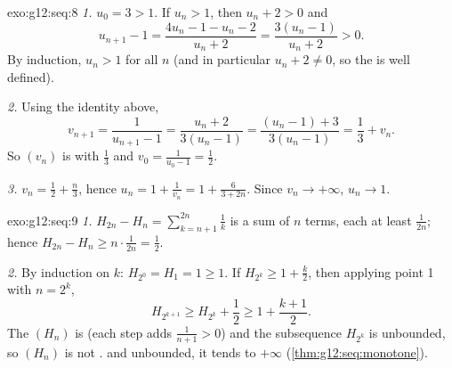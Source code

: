 \begin{solution}{exo:g12:seq:8}
\emph{1.} $u_0 = 3 > 1$. If $u_n > 1$, then $u_n + 2 > 0$ and
\[
u_{n+1} - 1 = \frac{4u_n - 1 - u_n - 2}{u_n + 2} = \frac{3(u_n - 1)}{u_n + 2} > 0 .
\]
By induction, $u_n > 1$ for all $n$ (and in particular $u_n + 2 \neq 0$, so
the  is well defined).

\emph{2.} Using the identity above,
\[
v_{n+1} = \frac{1}{u_{n+1} - 1} = \frac{u_n + 2}{3(u_n - 1)}
= \frac{(u_n - 1) + 3}{3(u_n - 1)} = \frac{1}{3} + v_n .
\]
So $(v_n)$ is  with  $\frac13$ and
$v_0 = \frac{1}{u_0 - 1} = \frac12$.

\emph{3.} $v_n = \frac12 + \frac{n}{3}$, hence
$u_n = 1 + \frac{1}{v_n} = 1 + \frac{6}{3 + 2n}$. Since $v_n \to +\infty$,
$u_n \to 1$.
\end{solution}

\begin{solution}{exo:g12:seq:9}
\emph{1.} $H_{2n} - H_n = \sum_{k=n+1}^{2n} \frac{1}{k}$ is a sum of $n$
terms, each at least $\frac{1}{2n}$; hence
$H_{2n} - H_n \geq n \cdot \frac{1}{2n} = \frac12$.

\emph{2.} By induction on $k$: $H_{2^0} = H_1 = 1 \geq 1$. If
$H_{2^k} \geq 1 + \frac{k}{2}$, then applying point 1 with $n = 2^k$,
\[
H_{2^{k+1}} \geq H_{2^k} + \frac12 \geq 1 + \frac{k+1}{2}.
\]
The  $(H_n)$ is  (each step adds $\frac{1}{n+1} > 0$) and
the subsequence $H_{2^k}$ is unbounded, so $(H_n)$ is not .
 and unbounded, it tends to $+\infty$
(\cref{thm:g12:seq:monotone}).
\end{solution}

